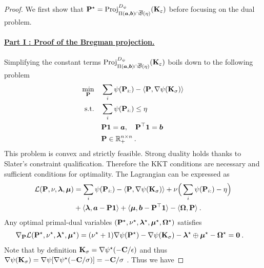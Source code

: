 \begin{proof}
    We first show that ${\mathbf{P}}^\star = \operatorname{Proj}^{D_\psi}_{\Pi(\bm{a}, \bm{b}) \cap \overline{\mathcal{B}}(\eta)}({\mathbf{K}}_\varepsilon)$ before focusing on the dual problem.

    \paragraph{\underline{Part I : Proof of the Bregman projection.}}

    Simplifying the constant terms $\operatorname{Proj}^{D_\psi}_{\Pi(\bm{a}, \bm{b}) \cap \overline{\mathcal{B}}(\eta)}({\mathbf{K}}_\varepsilon)$ boils down to the following problem
    \begin{align}
        \min_{{\mathbf{P}}} \quad &\sum_i \psi({\mathbf{P}}_{i:}) - \langle {\mathbf{P}}, \nabla \psi({\mathbf{K}}_\sigma) \rangle \\
        \text{s.t.} \quad &\sum_i \psi({\mathbf{P}}_{i:}) \leq \eta \\
        & {\mathbf{P}} \bm{1} = \bm{a}, \quad {\mathbf{P}}^\top \bm{1} = \bm{b} \\
        & {\mathbf{P}} \in \mathbb{R}_+^{n \times n} \:.
    \end{align}
    This problem is convex and strictly feasible. Strong duality holds thanks to Slater's constraint qualification. Therefore the KKT conditions \citep{boyd2004convex} are necessary and sufficient conditions for optimality.
    The Lagrangian can be expressed as
    \begin{align}
        \mathcal{L}({\mathbf{P}}, \nu, \bm{\lambda}, \bm{\mu}) &= \sum_i \psi({\mathbf{P}}_{i:}) - \langle {\mathbf{P}}, \nabla \psi({\mathbf{K}}_\sigma) \rangle + \nu\Big(\sum_i \psi({\mathbf{P}}_{i:}) - \eta \Big) \\
        &+ \langle \bm{\lambda}, \bm{a} - {\mathbf{P}} \bm{1} \rangle + \langle \bm{\mu}, \bm{b} - {\mathbf{P}}^\top \bm{1} \rangle - \langle \mathbf{\Omega}, {\mathbf{P}} \rangle \:.
    \end{align}
    Any optimal primal-dual variables $({\mathbf{P}}^\star, \nu^\star, \bm{\lambda}^\star, \bm{\mu}^\star, \mathbf{\Omega}^\star)$ satisfies
    \begin{align}
            \nabla_{{\mathbf{P}}} \mathcal{L}({\mathbf{P}}^\star,  \nu^\star, \bm{\lambda}^\star, \bm{\mu}^\star) &=  (\nu^\star + 1) \nabla \psi({\mathbf{P}}^\star) - \nabla \psi({\mathbf{K}}_\sigma) - \bm{\lambda}^\star \oplus \bm{\mu}^\star - \mathbf{\Omega}^\star = \bm{0} \:.
    \end{align}
    Note that by definition ${\mathbf{K}}_\sigma = \nabla \psi^\star(-{\mathbf{C}}/\epsilon)$ and thus $\nabla \psi({\mathbf{K}}_\sigma) = \nabla \psi[\nabla \psi^\star(-{\mathbf{C}}/\sigma)] = -{\mathbf{C}} / \sigma$ \citep{rockafellar1997convex}. Thus we have 

\end{proof}
